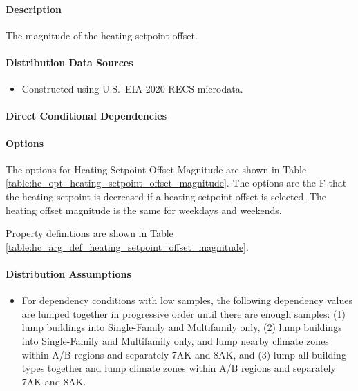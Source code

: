 \paragraph{Description}
% 
The magnitude of the heating setpoint offset.

\paragraph{Distribution Data Sources}
% 
\begin{itemize}
    \item Constructed using U.S.~EIA 2020 RECS microdata.
\end{itemize}

\paragraph{Direct Conditional Dependencies}


\paragraph{Options}
The options for Heating Setpoint Offset Magnitude are shown in Table \ref{table:hc_opt_heating_setpoint_offset_magnitude}. The options are the \degree F that the heating setpoint is decreased if a heating setpoint offset is selected. The heating offset magnitude is the same for weekdays and weekends.



Property definitions are shown in Table \ref{table:hc_arg_def_heating_setpoint_offset_magnitude}.



\paragraph{Distribution Assumptions}
% 
\begin{itemize}
    \item For dependency conditions with low samples, the following dependency values are lumped together in progressive order until there are enough samples: (1) lump buildings into Single-Family and Multifamily only, (2) lump buildings into Single-Family and Multifamily only, and lump nearby climate zones within A/B regions and separately 7AK and 8AK, and (3) lump all building types together and lump climate zones within A/B regions and separately 7AK and 8AK.
\end{itemize}
